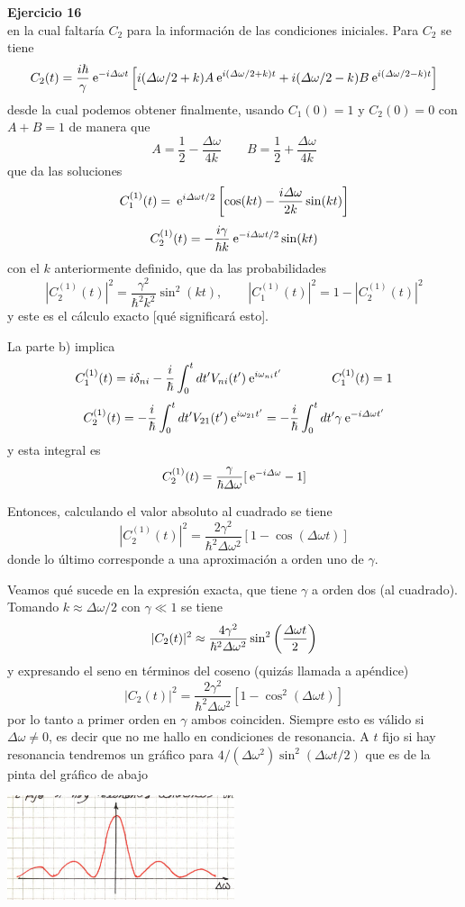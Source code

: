 \documentclass[10pt,oneside]{CBFT_book}
\begin{document}
\begin{ejemplo}{\bf Ejercicio 16}
\[\]
en la cual faltaría $C_2$ para la información de las condiciones iniciales.
Para $C_2$ se tiene
\[
	C_2(t) = \frac{i\hbar}{\gamma} \:\mathrm{e}^{-i\Delta \omega t}
	\left[ 
	i (\Delta\omega/2 + k ) A \:\mathrm{e}^{ i (\Delta\omega/2 + k ) t  } + 
	i (\Delta\omega/2 - k ) B \:\mathrm{e}^{ i (\Delta\omega/2 - k ) t}
	\right]
\]
desde la cual podemos obtener finalmente, usando $C_1(0) = 1$ y $C_2(0) = 0$ con 
$A+B=1$ de manera que 
\[
	A = \frac{1}{2} - \frac{\Delta\omega}{4k}
	\qquad 
	B = \frac{1}{2} + \frac{\Delta\omega}{4k}
\]
que da las soluciones
\[
	C_1^{(1)}(t) = \:\mathrm{e}^{ i \Delta\omega t / 2}
	\left[ \cos( k t ) - \frac{i \Delta\omega }{ 2 k } \sin( k t ) \right]
\]
\[
	C_2^{(1)}(t) = - \frac{i\gamma}{\hbar k} \:\mathrm{e}^{-i \Delta\omega t / 2} \sin( kt )
\]
con el $k$ anteriormente definido, 
que da las probabilidades
\[
	|C_2^{(1)}(t)|^2 = \frac{\gamma^2}{\hbar^2 k^2} \sin^2( k t ),
	\qquad 
	|C_1^{(1)}(t)|^2 = 1 - |C_2^{(1)}(t)|^2
\]
y este es el cálculo exacto [qué significará esto].

La parte b) implica 
\[
	 C_1^{(1)}(t) = i \delta_{ni} - \frac{i}{\hbar}
	 \int_0^t dt' V_{ni}(t') \:\mathrm{e}^{ i \omega_{ni} t'}
	 \qquad \qquad 
	 C_1^{(1)}(t) = 1
\]
\[
	C_2^{(1)}(t) = - \frac{i}{\hbar}
	 \int_0^t dt' V_{21}(t') \:\mathrm{e}^{ i \omega_{21} t'} =
	 - \frac{i}{\hbar}
	 \int_0^t dt' \gamma \:\mathrm{e}^{ - i \Delta\omega t'}
\]
y esta integral es
\[
	C_2^{(1)}(t) = \frac{\gamma}{\hbar\Delta\omega}
	[ \:\mathrm{e}^{-i\Delta\omega} - 1 ]
\]


Entonces, calculando el valor absoluto al cuadrado se tiene 
\[
	|C_2^{(1)}(t)|^2 = \frac{2\gamma^2}{\hbar^2\Delta\omega^2}
	[ 1 - \cos(\Delta\omega t) ]
\]
donde lo último corresponde a una aproximación a orden uno de $\gamma$.

Veamos qué sucede en la expresión exacta, que tiene $\gamma$ a orden dos
(al cuadrado).
Tomando $ k \approx \Delta\omega/2$ con $\gamma \ll 1$ se tiene
\[
	|C_2(t)|^2 \approx \frac{4\gamma^2}{\hbar^2\Delta\omega^2}
	\sin^2\left( \frac{ \Delta\omega t }{ 2 } \right)
\]
y expresando el seno en términos del coseno (quizás llamada a apéndice)
\[
	|C_2(t)|^2 = \frac{2\gamma^2}{\hbar^2\Delta\omega^2}
	[ 1 - \cos^2(\Delta \omega t)]
\]
por lo tanto a primer orden en $\gamma$ ambos coinciden. Siempre esto es válido
si $\Delta\omega \neq 0$, es decir que no me hallo en condiciones de
resonancia.
A $t$ fijo si hay resonancia tendremos un gráfico para 
$ 4 / (\Delta\omega^2 )\sin^2(\Delta\omega t/ 2)$
que es de la pinta del gráfico de abajo

\includegraphics[width=0.5\textwidth]{images/fig_ft2_scattering_section_p1.jpg}


\end{ejemplo}
\end{document}
